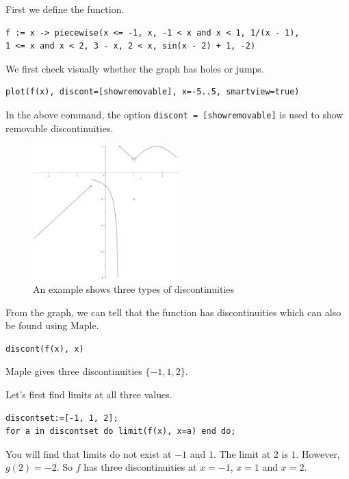 \documentclass[
  en,11pt,simple]{elegantbook}
\begin{document}
\begin{solution}
{}
First we define the function.

\begin{verbatim}
f := x -> piecewise(x <= -1, x, -1 < x and x < 1, 1/(x - 1),
1 <= x and x < 2, 3 - x, 2 < x, sin(x - 2) + 1, -2)
\end{verbatim}

We first check visually whether the graph has holes or jumps.

\begin{verbatim}
plot(f(x), discont=[showremovable], x=-5..5, smartview=true)
\end{verbatim}

In the above command, the option \texttt{discont\ =\ {[}showremovable{]}} is used to show removable discontinuities.

\begin{figure}
\centering
\includegraphics[width=0.5\textwidth,height=\textheight]{figs/Discontinuities.png}
\caption{An example shows three types of discontinuities}
\end{figure}

From the graph, we can tell that the function has discontinuities which can also be found using Maple.

\begin{verbatim}
discont(f(x), x)
\end{verbatim}

Maple gives three discontinuities \(\{-1, 1, 2\}\).

Let's first find limits at all three values.

\begin{verbatim}
discontset:=[-1, 1, 2];
for a in discontset do limit(f(x), x=a) end do;
\end{verbatim}

You will find that limits do not exist at \(-1\) and \(1\). The limit at \(2\) is \(1\).
However, \(g(2)=-2\). So \(f\) has three discontinuities at \(x=-1\), \(x=1\) and \(x=2\).
\end{solution}
\end{document}
